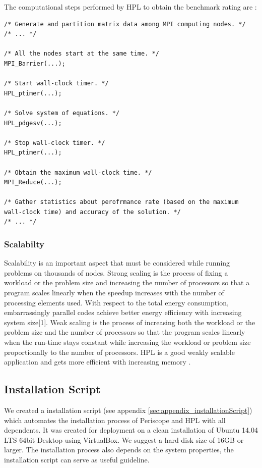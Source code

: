 \documentclass[10pt,twocolumn]{article}
\begin{document}
The computational steps performed by HPL to obtain the benchmark rating are :

\begin{lstlisting}
/* Generate and partition matrix data among MPI computing nodes. */
/* ... */

/* All the nodes start at the same time. */
MPI_Barrier(...);

/* Start wall-clock timer. */
HPL_ptimer(...);

/* Solve system of equations. */
HPL_pdgesv(...);

/* Stop wall-clock timer. */
HPL_ptimer(...);

/* Obtain the maximum wall-clock time. */
MPI_Reduce(...);

/* Gather statistics about perofrmance rate (based on the maximum wall-clock time) and accuracy of the solution. */
/* ... */

\end{lstlisting}


\subsubsection{Scalabilty}
Scalability is an important aspect that must be considered while running problems on thousands of nodes. Strong scaling is the process of fixing a workload or the problem size and increasing the number of processors so that a program scales linearly when the speedup increases with the number of processing elements used. With respect to the total energy consumption, embarrassingly parallel codes achieve better energy efficiency with increasing system size[1]. Weak scaling is the process of increasing both the workload or the problem size and the number of processors so that the program scales linearly when the run-time stays constant while increasing the workload or problem size proportionally to the number of processors. HPL is a good weakly scalable application and gets more efficient with increasing memory \cite{tibidabo}.


\subsection{Installation Script}
We created a installation script (see appendix \ref{sec:appendix_installationScript}) which automates the installation process of Periscope and HPL with all dependents. It was created for deployment on a clean installation of Ubuntu 14.04 LTS 64bit Desktop using VirtualBox. We suggest a hard disk size of 16GB or larger. The installation process also depends on the system properties, the installation script can serve as useful guideline.
\end{document}
